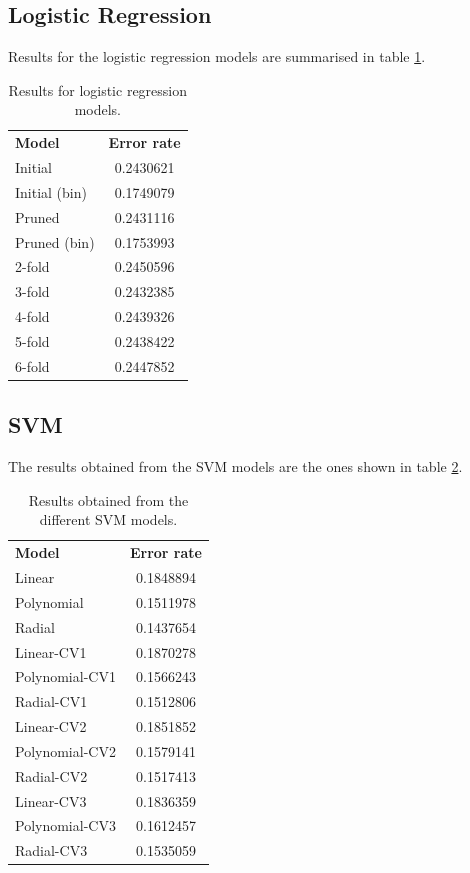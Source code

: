 \documentclass[english]{scrartcl}
\begin{document}
    \subsection{Logistic Regression}
    Results for the logistic regression models are summarised in table \ref{table:logit-results}.
    
    \begin{table}[h]
    \centering
    \begin{tabular}{l c}
    \textbf{Model} & \textbf{Error rate} \\
    Initial & 0.2430621 \\
    Initial (bin) & 0.1749079 \\
    Pruned & 0.2431116 \\
    Pruned (bin) & 0.1753993 \\
    2-fold & 0.2450596 \\
    3-fold & 0.2432385 \\
    4-fold & 0.2439326 \\
    5-fold & 0.2438422 \\
    6-fold & 0.2447852 \\
    \end{tabular}
    \caption{Results for logistic regression models.}
    \label{table:logit-results}
    \end{table}
    
        
    \subsection{SVM}
    The results obtained from the SVM models are the ones shown in table \ref{table:svm-results}.
    
    \begin{table}[h]
    \centering
    \begin{tabular}{l c}
    \textbf{Model} & \textbf{Error rate} \\
    Linear & 0.1848894 \\
	Polynomial & 0.1511978 \\
	Radial & 0.1437654 \\
	Linear-CV1 & 0.1870278 \\
	Polynomial-CV1 & 0.1566243 \\
	Radial-CV1 & 0.1512806 \\
	Linear-CV2 & 0.1851852 \\
	Polynomial-CV2 & 0.1579141 \\
	Radial-CV2 & 0.1517413 \\
	Linear-CV3 & 0.1836359 \\
	Polynomial-CV3 & 0.1612457 \\
	Radial-CV3 & 0.1535059 \\
    \end{tabular}
    \caption{Results obtained from the different SVM models.}
    \label{table:svm-results}
    \end{table}
    
\end{document}
